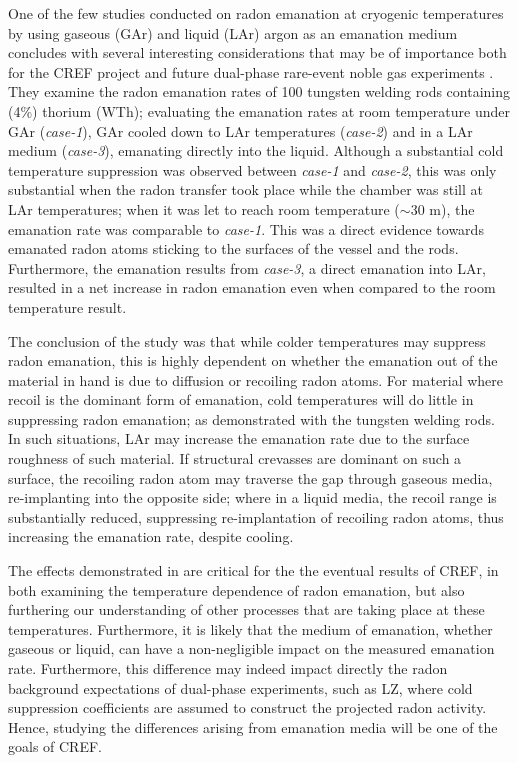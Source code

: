 One of the few studies conducted on radon emanation at cryogenic temperatures by using gaseous (GAr) and liquid (LAr) argon as an emanation medium concludes with several interesting considerations that may be of importance both for the CREF project and future dual-phase rare-event noble gas experiments \cite{cold_radon_measurements}. They examine the radon emanation rates of 100 tungsten welding rods containing (4\%) thorium (WTh); evaluating the emanation rates at room temperature under GAr (\textit{case-1}), GAr cooled down to LAr temperatures (\textit{case-2}) and in a LAr medium (\textit{case-3}), emanating directly into the liquid. Although a substantial cold temperature suppression was observed between \textit{case-1} and \textit{case-2}, this was only substantial when the radon transfer took place while the chamber was still at LAr temperatures; when it was let to reach room temperature ($\sim30$ m), the emanation rate was comparable to \textit{case-1}. This was a direct evidence towards emanated radon atoms sticking to the surfaces of the vessel and the rods. Furthermore, the emanation results from \textit{case-3}, a direct emanation into LAr, resulted in a net increase in radon emanation even when compared to the room temperature result. 

The conclusion of the study was that while colder temperatures may suppress radon emanation, this is highly dependent on whether the emanation out of the material in hand is due to diffusion or recoiling radon atoms. For material where recoil is the dominant form of emanation, cold temperatures will do little in suppressing radon emanation; as demonstrated with the tungsten welding rods. In such situations, LAr may increase the emanation rate due to the surface roughness of such material. If structural crevasses are dominant on such a surface, the recoiling radon atom may traverse the gap through gaseous media, re-implanting into the opposite side; where in a liquid media, the recoil range is substantially reduced, suppressing re-implantation of recoiling radon atoms, thus increasing the emanation rate, despite cooling. 

The effects demonstrated in \cite{cold_radon_measurements} are critical for the the eventual results of CREF, in both examining the temperature dependence of radon emanation, but also furthering our understanding of other processes that are taking place at these temperatures. Furthermore, it is likely that the medium of emanation, whether gaseous or liquid, can have a non-negligible impact on the measured emanation rate. Furthermore, this difference may indeed impact directly the radon background expectations of dual-phase experiments, such as LZ, where cold suppression coefficients are assumed to construct the projected radon activity. Hence, studying the differences arising from emanation media will be one of the goals of CREF.  